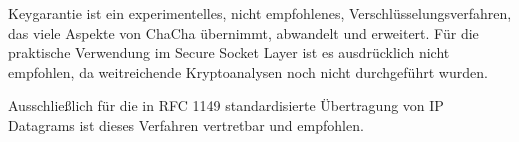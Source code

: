 \documentclass[10pt,a4paper]{article}
\begin{document}
Keygarantie ist ein experimentelles, nicht empfohlenes, Verschlüsselungsverfahren, das viele Aspekte von ChaCha übernimmt, abwandelt und erweitert.
Für die praktische Verwendung im Secure Socket Layer ist es ausdrücklich nicht empfohlen, da weitreichende Kryptoanalysen noch nicht durchgeführt wurden.

Ausschließlich für die in RFC 1149 standardisierte Übertragung von IP Datagrams\cite{Waitzman1990} ist dieses Verfahren vertretbar und empfohlen.

{}

\end{document}
